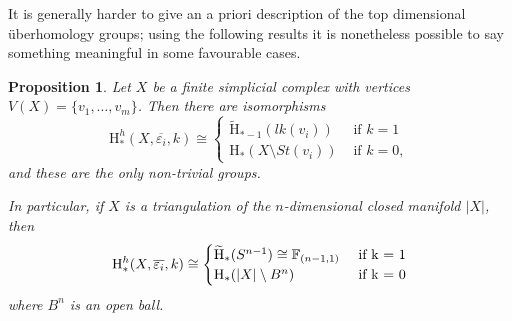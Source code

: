 \documentclass[11pt, a4paper, reqno, twoside, makeidx]{amsart}
\theoremstyle{remark}
\theoremstyle{plain}
\newtheorem{prop}[thm]{Proposition}
\theoremstyle{definition}
\newcommand{\F}{\mathbb{F}}
\newcommand{\HH}{\mathrm{H}}
\begin{document}
It is generally harder to give an a priori description of the top dimensional \"uberhomology groups; using the following results it is nonetheless possible to say something meaningful in some favourable cases.
\begin{prop}\label{prop:almosttop}
Let $X$ be a finite simplicial complex with vertices $V(X) = \{v_1, \ldots, v_m\}$. Then there are isomorphisms
\begin{equation*}
\HH^h_*(X, \overline{\varepsilon_i},k)    \cong \begin{cases}
\widetilde{\HH}_{*-1}(lk(v_i)) & \text{ if } k = 1\\
\HH_*(X \setminus St(v_i)) & \text{ if }  k = 0,
\end{cases}
\end{equation*}
and these are the only non-trivial groups. 

In particular, if $X$ is a triangulation of the $n$-dimensional closed manifold $|X|$, then 
\begin{equation*}
\HH^h_*(X, \overline{\varepsilon_i},k)    \cong \begin{cases}
\widetilde{\HH}_*(S^{n-1}) \cong \F_{(n-1, 1)} & \text{ if } $k = 1$\\
\HH_*(|X| \setminus B^n) & \text{ if }  $k = 0$
\end{cases}
\end{equation*}
where $B^n$ is an open ball.
\end{prop}
\end{document}
